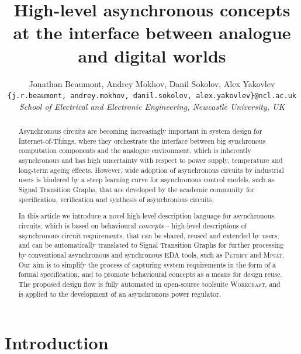 \documentclass[british,compsoc]{IEEEtran}
\newcommand{\noun}[1]{\textsc{#1}}
\begin{document}

\title{High-level asynchronous concepts at the interface between analogue and digital worlds}
\author{Jonathan Beaumont, Andrey Mokhov, Danil Sokolov, Alex Yakovlev\\
\texttt{\{j.r.beaumont, andrey.mokhov, danil.sokolov, alex.yakovlev\}@ncl.ac.uk}\\
\emph{School of Electrical and Electronic Engineering, Newcastle University,
UK}}

\maketitle

\begin{abstract}
Asynchronous circuits are becoming increasingly important in
system design for Internet-of-Things, where they orchestrate
the interface between big synchronous computation components
and the analogue environment, which is inherently asynchronous
and has high uncertainty with respect to power supply,
temperature and long-term ageing effects.
However, wide adoption of asynchronous circuits by industrial users is
hindered by a steep learning curve for asynchronous control models,
such as Signal Transition Graphs, that are developed by the academic
community for specification, verification and synthesis of
asynchronous circuits.

In this article we introduce a novel high-level description language
for asynchronous circuits, which is based on behavioural
\textit{concepts} -- high-level descriptions of asynchronous circuit
requirements, that can be shared, reused and extended by users,
and can be automatically translated to Signal Transition Graphs for
further processing by conventional asynchronous and synchronous EDA tools,
such as \noun{Petrify} and \noun{Mpsat}.
Our aim is to simplify the process of capturing system requirements in the
form of a formal specification, and to promote behavioural concepts as a
means for design reuse. The proposed design flow is fully automated in
open-source toolsuite \noun{Workcraft}, and is applied to the development of
an asynchronous power regulator.
\end{abstract}

\sloppy
\thispagestyle{empty}

\section{Introduction}
\end{document}
